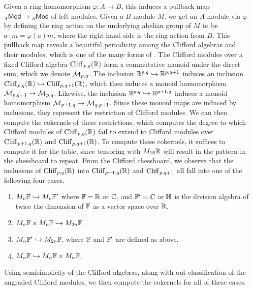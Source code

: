 Given a ring homomorphism $\varphi : A \to B$, this induces a pullback map
${}_A\mathsf{Mod} \to {}_B\mathsf{Mod}$ of left modules. Given a $B$ module $M$,
we get an $A$ module via $\varphi$ by defining the ring action on the underlying
abelian group of $M$ to be $a \cdot m = \varphi(a)m$, where the right hand side
is the ring action from $B$. This pullback map reveals a beautiful periodicity
among the Clifford algebras and their modules, which is one of the many forms
of . The Clifford modules over a fixed Clifford algebra
$\operatorname{Cliff}_{p,q}(\mathbb{R})$ form a commutative monoid under the direct sum, which
we denote $\mathcal{M}_{p,q}$. The inclusion $\mathbb{R}^{p,q} \hookrightarrow \mathbb{R}^{p,q+1}$ induces
an inclusion $\operatorname{Cliff}_{p,q}(\mathbb{R}) \hookrightarrow \operatorname{Cliff}_{p,q+1}(\mathbb{R})$, which then
induces a monoid homomorphism $\mathcal{M}_{p,q+1} \to \mathcal{M}_{p,q}$. Likewise, the inclusion
$\mathbb{R}^{p,q}\hookrightarrow \mathbb{R}^{p+1,q}$ induces a monoid homomorphism
$\mathcal{M}_{p+1,q} \to \mathcal{M}_{q,p+1}$. Since these monoid maps are induced by
inclusions, they represent the restriction of Clifford modules. We can then
compute the cokernels of these restrictions, which computes the degree to
which Clifford modules of $\operatorname{Cliff}_{p,q}(\mathbb{R})$ fail to extend to Clifford modules
over $\operatorname{Cliff}_{p+1,q}(\mathbb{R})$ and $\operatorname{Cliff}_{p,q+1}(\mathbb{R})$. To compute these cokernels,
it suffices to compute it for the table, since tensoring with $M_{16}\mathbb{R}$ will
result in the pattern in the chessboard to repeat. From the Clifford chessboard,
we observe that the inclusions of $\operatorname{Cliff}_{p,q}(\mathbb{R})$ into $\operatorname{Cliff}_{p+1,q}(\mathbb{R})$
and $\operatorname{Cliff}_{p,q+1}$ all fall into one of the following four cases.
%
\begin{enumerate}
  \item $M_n\mathbb{F} \hookrightarrow M_n\mathbb{F}'$ where $\mathbb{F} = \mathbb{R}$ or $\mathbb{C}$, and $\mathbb{F}' = \mathbb{C}$
  or $\mathbb{H}$ is the division algebra of twice the dimension of $\mathbb{F}$ as a
  vector space over $\mathbb{R}$.
  \item $M_n\mathbb{F} \times M_n\mathbb{F} \hookrightarrow M_{2n}\mathbb{F}$.
  \item $M_n\mathbb{F}' \hookrightarrow M_{2n}\mathbb{F}$, where $\mathbb{F}$ and $\mathbb{F}'$ are defined as above.
  \item $M_n\mathbb{F} \hookrightarrow M_n\mathbb{F} \times M_n\mathbb{F}$.
\end{enumerate}
%
Using semisimplicity of the Clifford algebras, along with out classification of
the ungraded Clifford modules, we then compute the cokernels for all of these
cases.
%

